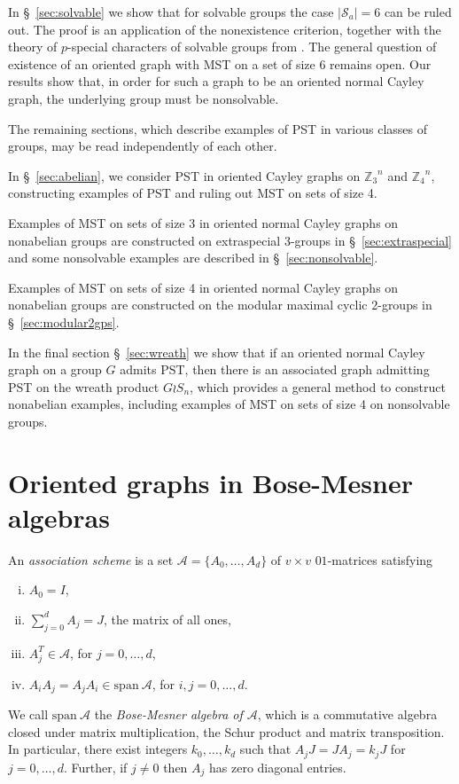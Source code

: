 \documentclass{amsart}
\theoremstyle{plain}
\theoremstyle{remark}\newtheorem{con}[theorem]{Construction}
\theoremstyle{remark} \newtheorem*{remark}{Remark}
\theoremstyle{remark} \newtheorem{example}{Example}
\newcommand{\cS}{\mathcal{S}}
\newcommand{\cA}{\mathcal{A}}
\newcommand{\BM}{\mathrm{span}\ \mathcal{A}}
\newcommand{\abs}[1]{|#1|}
\begin{document}
In \S~\ref{sec:solvable} we show that for solvable groups the case $\abs{\cS_a}=6$ can be ruled out. 
The proof is an application of the nonexistence criterion, together with the theory of $p$-special characters of solvable groups from \cite{Gajendragadkar}.
The general question of existence of an oriented graph 
with MST on a set of size 6 remains open.
Our results show that, in order for such a graph to be an oriented normal Cayley graph, the underlying group must be nonsolvable.

The remaining sections, which describe examples of PST in various classes of groups, may be read independently of each other.

In \S~\ref{sec:abelian}, we consider PST in oriented Cayley graphs on ${\mathbb Z_3}^n$ and ${\mathbb Z_4}^n$, constructing examples of PST and
ruling out MST on sets of size 4.

Examples of MST on sets of size 3 in oriented normal Cayley graphs on nonabelian groups are constructed on
extraspecial $3$-groups in \S~\ref{sec:extraspecial} 
and some nonsolvable examples are described in \S~\ref{sec:nonsolvable}.

Examples of MST on sets of size 4 in oriented normal Cayley graphs on nonabelian groups are constructed on
the modular maximal cyclic $2$-groups in \S~\ref{sec:modular2gps}.

In the final section \S~\ref{sec:wreath} we show that if an oriented normal Cayley graph on a group $G$ admits PST, then there is an associated graph
admitting PST on the wreath product $G\wr S_n$,
which provides a general method to construct nonabelian examples, including examples of MST on sets of size 4
on nonsolvable groups.

\section{Oriented graphs in Bose-Mesner algebras}\label{sec:BM}

An {\it association scheme} is a set $\cA=\{A_0, \ldots, A_d\}$ of $v\times v$ $01$-matrices satisfying
\begin{enumerate}[i.]
\item
$A_0=I$,
\item
$\displaystyle \sum_{j=0}^d A_j = J$, the matrix of all ones,
\item 
$A_j^T \in \cA$, for $j=0,\ldots, d$,
\item
$A_i A_j = A_jA_i\in \BM$, for $i,j = 0,\ldots,d$.
\end{enumerate}
We call $\BM$ the {\it Bose-Mesner algebra of $\cA$}, which is a commutative algebra closed under matrix multiplication, the Schur product and matrix transposition.   In particular, there exist integers $k_0,\ldots, k_d$ such that
$A_j J = JA_j = k_jJ$ for $j=0,\ldots, d$.  Further, if $j\neq 0$
then $A_j$ has zero diagonal entries.
\end{document}
